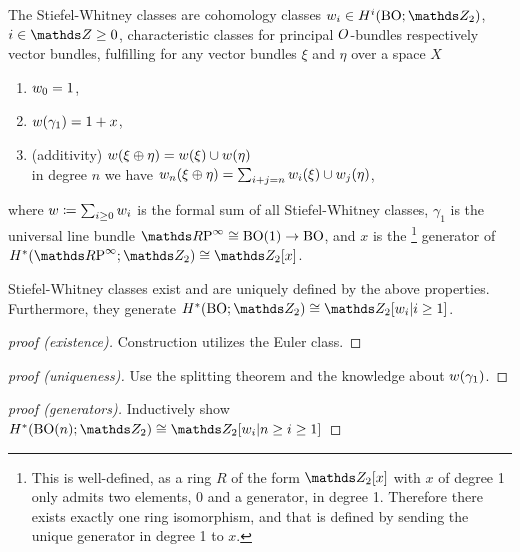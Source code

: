 \begin{Def}
  The Stiefel-Whitney classes are cohomology classes
  $w_i\in H^i(\BO;\Zmod2)$, $i\in\Z\geq0$,
  \idest characteristic classes for principal $O$-bundles
  respectively vector bundles, fulfilling
  for any vector bundles $\xi$ and $\eta$ over a space $X$
  \begin{enumerate}
  \item $\w_0%
    = 1$,
  \item $w(\gamma_1) = 1 + x$,
  \item (additivity) $w(\xi \oplus \eta) = w(\xi)\cup w(\eta)$
    \\\idest in degree $n$ we have
    $w_n(\xi\oplus\eta) = \sum_{i+j=n}w_i(\xi) \cup w_j(\eta)$,
  \end{enumerate}
  where
  $w\coloneqq\sum_{i\geq 0}w_i$ is the formal sum of all
  Stiefel-Whitney classes,
  $\gamma_1$ is the universal line bundle $\RP\cong\BO(1)\to\BO$,
  and $x$ is the%
  \footnote{
    This is well-defined, as a ring $R$ of the form $\Zmod2[x]$
    with $x$ of degree 1 only admits two elements, $0$ and a
    generator, in degree 1. Therefore there exists exactly one ring
    isomorphism, and that is defined by sending the unique generator in
    degree 1 to $x$.
  }
  generator of $H^*(\RP;\Zmod2)\cong\Zmod2[x]$.
\end{Def}

\begin{Thm} %
Stiefel-Whitney classes exist and are uniquely defined by the above
properties. Furthermore, they generate $H^*(\BO;\Zmod2)\cong \Zmod2[\w_i|i\geq1]$.
\begin{proof}[proof (existence)]
  Construction utilizes the Euler class.
\end{proof}
\begin{proof}[proof (uniqueness)]
  Use the splitting theorem and the knowledge about $w(\gamma_1)$.
\end{proof}
\begin{proof}[proof (generators)]
  Inductively show $H^*(\BO(n);\Zmod2)\cong \Zmod2[\w_i|n\geq i\geq1]$
\end{proof}
\end{Thm}


